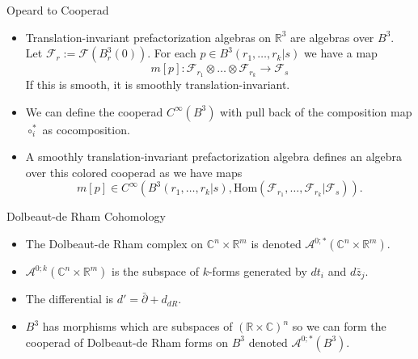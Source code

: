 \documentclass{beamer}
\newcommand{\C}{\mathbb{C}}
\newcommand{\R}{\mathbb{R}}
\begin{document}
\begin{frame}{Opeard to Cooperad}
    \begin{itemize}
        
    
    \item Translation-invariant prefactorization algebras on $\R^3$ are algebras over $B^3$. Let $\mathcal{F}_r := \mathcal{F}(B^3_r(0))$. For each $p\in B^3(r_1,\dots,r_k|s)$ we have a map
    \[
        m[p]:\mathcal{F}_{r_1}\otimes \dots \otimes \mathcal{F}_{r_k} \to \mathcal{F}_s
    \]
    If this is smooth, it is smoothly translation-invariant.
    \pause 
   
   
    \item We can define the cooperad  $C^\infty(B^3)$ with pull back of the composition map $\circ_i^*$ as cocomposition. 
    
    
    \item A smoothly translation-invariant prefactorization algebra defines an algebra over this colored cooperad as we have maps
    \[
        m[p]\in C^\infty(B^3(r_1,\dots,r_k|s),\mathrm{Hom}(\mathcal{F}_{r_1},\dots ,\mathcal{F}_{r_k}|\mathcal{F}_s)).
    \]
    \end{itemize}
\end{frame}



\begin{frame}{Dolbeaut-de Rham Cohomology}
    \begin{itemize}

        \item The Dolbeaut-de Rham complex on $\C^n \times \R^m$ is denoted $\mathcal{A}^{0;*}(\C^n\times \R^m)$.
        \item $\mathcal{A}^{0;k}(\C^n\times \R^m)$ is the subspace of $k$-forms generated by $dt_i$ and $d\bar{z}_j$.
        \item The differential is $d'=\bar{\partial}+d_{dR}$.
        \item  $B^3$ has morphisms which are subspaces of $(\R \times \C)^n$ so we can form the cooperad of Dolbeaut-de Rham forms on $B^3$ denoted $\mathcal{A}^{0;*}(B^3)$.
    \end{itemize}

\end{frame}
\end{document}
